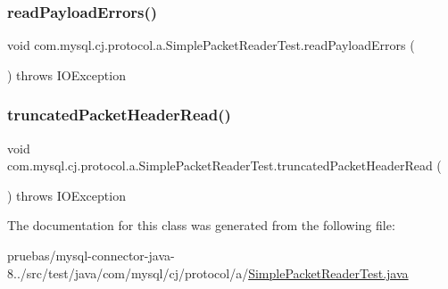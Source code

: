 \subsubsection{\texorpdfstring{read\+Payload\+Errors()}{readPayloadErrors()}}
{\footnotesize\ttfamily void com.\+mysql.\+cj.\+protocol.\+a.\+Simple\+Packet\+Reader\+Test.\+read\+Payload\+Errors (\begin{DoxyParamCaption}{ }\end{DoxyParamCaption}) throws I\+O\+Exception}

\mbox{\label{classcom_1_1mysql_1_1cj_1_1protocol_1_1a_1_1_simple_packet_reader_test_aeab8953b67cd52f0c1c001e4b59fd584}} 
\subsubsection{\texorpdfstring{truncated\+Packet\+Header\+Read()}{truncatedPacketHeaderRead()}}
{\footnotesize\ttfamily void com.\+mysql.\+cj.\+protocol.\+a.\+Simple\+Packet\+Reader\+Test.\+truncated\+Packet\+Header\+Read (\begin{DoxyParamCaption}{ }\end{DoxyParamCaption}) throws I\+O\+Exception}



The documentation for this class was generated from the following file\+:\begin{DoxyCompactItemize}
\item 
pruebas/mysql-\/connector-\/java-\/8../src/test/java/com/mysql/cj/protocol/a/\mbox{\hyperlink{_simple_packet_reader_test_8java}{Simple\+Packet\+Reader\+Test.\+java}}\end{DoxyCompactItemize}
